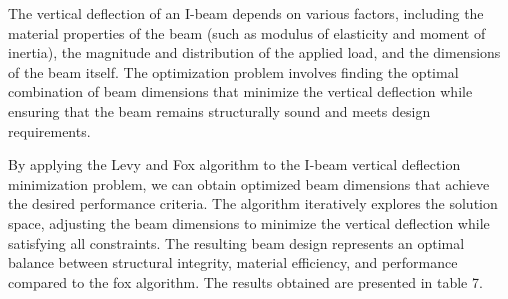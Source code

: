 \documentclass[
]{article}
\begin{document}
\begin{justify}
{The vertical deflection of an I-beam depends on various factors, including the material properties of the beam (such as modulus of elasticity and moment of inertia), the magnitude and distribution of the applied load, and the dimensions of the beam itself. The optimization problem involves finding the optimal combination of beam dimensions that minimize the vertical deflection while ensuring that the beam remains structurally sound and meets design requirements.

By applying the Levy and Fox algorithm to the I-beam vertical deflection minimization problem, we can obtain optimized beam dimensions that achieve the desired performance criteria. The algorithm iteratively explores the solution space, adjusting the beam dimensions to minimize the vertical deflection while satisfying all constraints. The resulting beam design represents an optimal balance between structural integrity, material efficiency, and performance compared to the fox algorithm. The results obtained are presented in table 7.

}
\end{justify}
\end{document}
